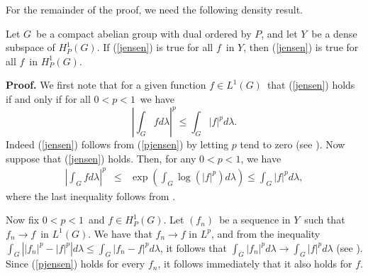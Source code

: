 For the remainder of the proof, we need the following density result.
\begin{density}
Let $G$\ be a compact abelian group with dual ordered by
$P$, and let $Y$\ be a dense subspace of $H^1_P(G)$.
If (\ref{jensen}) is true for all $f$\ in $Y$, then
(\ref{jensen}) is true for all $f$\ in $H^1_P(G)$.
\label{density}
\end{density}
{\bf Proof.}  
We first note that for a given function $f \in L^1(G)$\ that (\ref{jensen})
holds if and only if for all $0<p<1$\ we have
\begin{equation}
   \left| \int_G f d\lambda\right|^p \le
   \int_G |f|^p d\lambda .
\label{pjensen}
\end{equation}
Indeed (\ref{jensen}) follows from (\ref{pjensen}) 
by letting $p$ tend to zero
(see \cite[(13.32)(ii)]{hs}).  Now suppose that (\ref{jensen}) holds.
Then, for any $0<p<1$, we have
\begin{eqnarray*}
\left| \int_G f d\lambda\right|^p 
					&\leq&
\exp\left(\int_G \log\left(|f|^p\right) d\lambda \right)
					\leq
\int_G |f|^p d\lambda,
\end{eqnarray*}
where the last inequality follows from 
\cite[(13.32) (i)]{hs}.

Now fix $0<p<1$\ and $f \in H^1_P(G)$.  
Let $(f_n)$\ be a sequence in $Y$\
such that $f_n \to f$\ in $L^1(G)$.  
We have that 
$f_n \to f$ in $L^p$, and from the inequality
$\int_G\left| |f_n|^p-|f|^p\right|d \lambda\leq 
\int_G\left|f_n-f\right|^p d\lambda$, it follows that
$\int_G\left|f_n\right|^p d\lambda\to 
\int_G\left|f\right|^p d\lambda$
(see \cite[Theorem (13.17) and (13.25) (a)]{hs}).
Since (\ref{pjensen}) holds for every $f_n$, it
follows immediately that it also holds for $f$.

